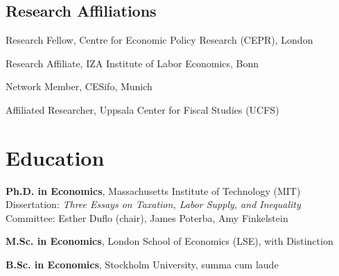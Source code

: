 \documentclass[11pt]{article}
\newcommand{\dated}[2]{%
  \noindent\makebox[5.2em][l]{\textcolor{mutedgray}{#1}}%
  \begin{minipage}[t]{\dimexpr\linewidth-5.4em\relax}#2\end{minipage}\par\vspace{3pt}}
\begin{document}
\subsection{Research Affiliations}
\dated{2019--}{Research Fellow, Centre for Economic Policy Research (CEPR), London}
\dated{2017--}{Research Affiliate, IZA Institute of Labor Economics, Bonn}
\dated{2018--}{Network Member, CESifo, Munich}
\dated{2020--}{Affiliated Researcher, Uppsala Center for Fiscal Studies (UCFS)}

\section{Education}
\dated{2011}{\textbf{Ph.D. in Economics}, Massachusetts Institute of Technology (MIT)\\
  Dissertation: \emph{Three Essays on Taxation, Labor Supply, and Inequality}\\
  Committee: Esther Duflo (chair), James Poterba, Amy Finkelstein}
\dated{2006}{\textbf{M.Sc. in Economics}, London School of Economics (LSE), with Distinction}
\dated{2004}{\textbf{B.Sc. in Economics}, Stockholm University, summa cum laude}

\end{document}
